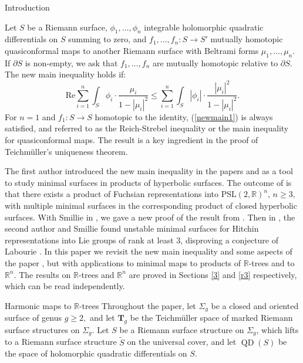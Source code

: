 \documentclass[10pt]{amsart}
\newcommand{\R}{\mathbb R}
\DeclareMathOperator{\QD}{\textrm{QD}}
\theoremstyle{definition}
\begin{document}
\begin{section}{Introduction}

Let $S$ be a Riemann surface, $\phi_1,\dots,\phi_n$ integrable holomorphic quadratic differentials on $S$ summing to zero, and $f_1,\dots, f_n:S\to S'$ mutually homotopic quasiconformal maps to another Riemann surface with Beltrami forms $\mu_1,\dots,\mu_n$. If $\partial S$ is non-empty, we ask that $f_1,\dots, f_n$ are mutually homotopic relative to $\partial S$. The new main inequality holds if: 
 \begin{equation}\label{newmain1}
     \textrm{Re}\sum_{i=1}^n \int_S \phi_i\cdot \frac{ \mu_i}{1-|\mu_i|^2} \leq \sum_{i=1}^n \int_S |\phi_i|\cdot \frac{|\mu_i|^2}{1-|\mu_i|^2}.
 \end{equation}
For $n=1$ and $f_1:S\to S$ homotopic to the identity, (\ref{newmain1}) is always satisfied, and referred to as the Reich-Strebel inequality or the main inequality for quasiconformal maps. The result is a key ingredient in the proof of Teichm{\"u}ller's uniqueness theorem.

The first author introduced the new main inequality in the papers \cite{M1} and \cite{M2} as a tool to study minimal surfaces in products of hyperbolic surfaces. The outcome of \cite{M2} is that there exists a product of Fuchsian representations into $\textrm{PSL}(2,\R)^n$, $n\geq 3,$ with multiple minimal surfaces in the corresponding product of closed hyperbolic surfaces. With Smillie in \cite{MSS}, we gave a new proof of the result from \cite{M2}. Then in \cite{SS}, the second author and Smillie found unstable minimal surfaces for Hitchin representations into Lie groups of rank at least $3$, disproving a conjecture of Labourie \cite{L0}. In this paper we revisit the new main inequality and some aspects of the paper \cite{M2}, but with applications to minimal maps to products of $\R$-trees and to $\R^n$. The results on $\R$-trees and $\R^n$ are proved in Sections \ref{3} and \ref{r3} respectively, which can be read independently.

\begin{subsection}{Harmonic maps to $\R$-trees}
 Throughout the paper, let $\Sigma_g$ be a closed and oriented surface of genus $g\geq 2,$ and let $\mathbf{T}_g$ be the Teichm{\"u}ller space of marked Riemann surface structures on $\Sigma_g$. Let $S$ be a Riemann surface structure on $\Sigma_g$, which lifts to a Riemann surface structure $\tilde{S}$ on the universal cover, and let $\QD(S)$ be the space of holomorphic quadratic differentials on $S$.


\end{subsection}
\end{section}
\end{document}
